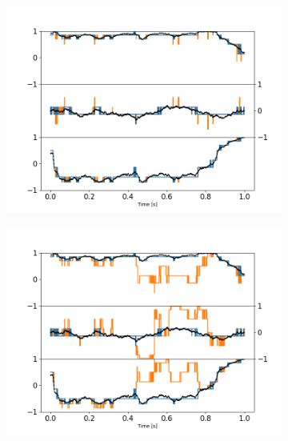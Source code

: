 \documentclass[preprint,  3p]{elsarticle}
\begin{document}
\begin{figure}[h]
	\centering
	\begin{subfigure}{0.31\textwidth}
		\subcaption{}
		\includegraphics[width =\textwidth]{./Images/fig9a.png}
	\end{subfigure}
	\begin{subfigure}{0.31\textwidth}
		\subcaption{}
		\includegraphics[width=\textwidth]{./Images/fig9b.png}
	\end{subfigure}
	\begin{subfigure}{0.31\textwidth}
		\subcaption{}

\end{subfigure}
\end{figure}
\end{document}
